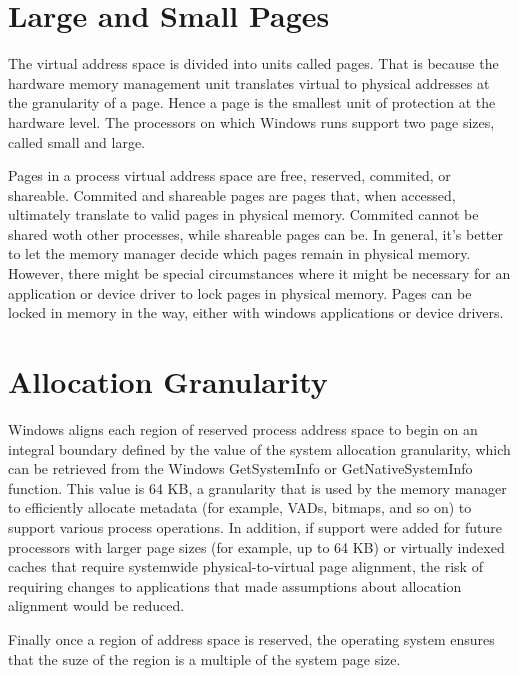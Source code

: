 \documentclass[letterpaper,10pt,draftclsnofoot,onecolumn]{IEEEtran}
\begin{document}
\section*{Large and Small Pages}

The virtual address space is divided into units called pages. That is because the hardware memory management unit translates virtual to physical addresses at the granularity of a page. Hence a page is the smallest unit of protection at the hardware level. The processors on which Windows runs support two page sizes, called small and large. 

Pages in a process virtual address space are free, reserved, commited, or shareable. Commited and shareable pages are pages that, when accessed, ultimately translate to valid pages in physical memory. Commited cannot be shared woth other processes, while shareable pages can be. In general, it’s better to let the memory manager decide which pages remain in physical memory. However, there might be special circumstances where it might be necessary for an application or device driver to lock pages in physical memory. Pages can be locked in memory in the way, either with windows applications or device drivers.

\section*{Allocation Granularity}

Windows aligns each region of reserved process address space to begin on an integral boundary
defined by the value of the system allocation granularity, which can be retrieved from the Windows GetSystemInfo or GetNativeSystemInfo function. This value is 64 KB, a granularity that is used by the memory manager to efficiently allocate metadata (for example, VADs, bitmaps, and so on) to support various process operations. In addition, if support were added for future processors with larger page sizes (for example, up to 64 KB) or virtually indexed caches that require systemwide physical-to-virtual page alignment, the risk of requiring changes to applications that made assumptions about allocation alignment would be reduced.\cite{[1]}

Finally once a region of address space is reserved, the operating system ensures that the suze of the region is a multiple of the system page size.
\end{document}
